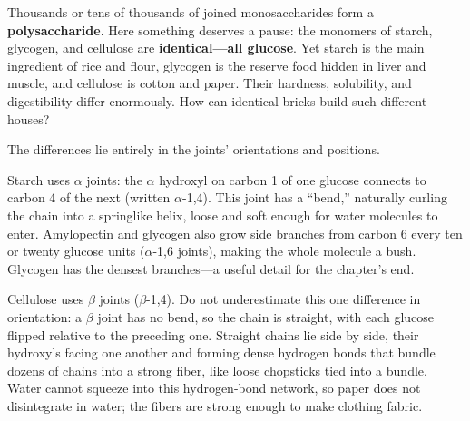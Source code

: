 Thousands or tens of thousands of joined monosaccharides form a \textbf{polysaccharide}. Here something deserves a pause: the monomers of starch, glycogen, and cellulose are \textbf{identical---all glucose}. Yet starch is the main ingredient of rice and flour, glycogen is the reserve food hidden in liver and muscle, and cellulose is cotton and paper. Their hardness, solubility, and digestibility differ enormously. How can identical bricks build such different houses?

The differences lie entirely in the joints' orientations and positions.

Starch uses $\alpha$ joints: the $\alpha$ hydroxyl on carbon 1 of one glucose connects to carbon 4 of the next (written $\alpha$-1,4). This joint has a ``bend,'' naturally curling the chain into a springlike helix, loose and soft enough for water molecules to enter. Amylopectin and glycogen also grow side branches from carbon 6 every ten or twenty glucose units ($\alpha$-1,6 joints), making the whole molecule a bush. Glycogen has the densest branches---a useful detail for the chapter's end.

Cellulose uses $\beta$ joints ($\beta$-1,4). Do not underestimate this one difference in orientation: a $\beta$ joint has no bend, so the chain is straight, with each glucose flipped relative to the preceding one. Straight chains lie side by side, their hydroxyls facing one another and forming dense hydrogen bonds that bundle dozens of chains into a strong fiber, like loose chopsticks tied into a bundle. Water cannot squeeze into this hydrogen-bond network, so paper does not disintegrate in water; the fibers are strong enough to make clothing fabric.

\begin{center}
\end{center}

